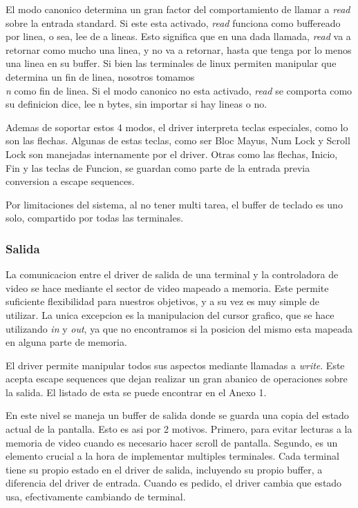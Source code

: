 \documentclass[a4paper,10pt]{article}
\begin{document}
            El modo canonico determina un gran factor del comportamiento de llamar a \textit{read} sobre la entrada standard.
            Si este esta activado, \textit{read} funciona como buffereado por linea, o sea, lee de a lineas.
            Esto significa que en una dada llamada, \textit{read} va a retornar como mucho una linea, y no va a retornar, hasta que tenga por lo menos una linea en su buffer.
            Si bien las terminales de linux permiten manipular que determina un fin de linea, nosotros tomamos \textit{\\n} como fin de linea.
            Si el modo canonico no esta activado, \textit{read} se comporta como su definicion dice, lee n bytes, sin importar si hay lineas o no.

            Ademas de soportar estos 4 modos, el driver interpreta teclas especiales, como lo son las flechas.
            Algunas de estas teclas, como ser Bloc Mayus, Num Lock y Scroll Lock son manejadas internamente por el driver.
            Otras como las flechas, Inicio, Fin y las teclas de Funcion, se guardan como parte de la entrada previa conversion a escape sequences.

            Por limitaciones del sistema, al no tener multi tarea, el buffer de teclado es uno solo, compartido por todas las terminales.

        \subsubsection{Salida}
            La comunicacion entre el driver de salida de una terminal y la controladora de video se hace mediante el sector de video mapeado a memoria.
            Este permite suficiente flexibilidad para nuestros objetivos, y a su vez es muy simple de utilizar.
            La unica excepcion es la manipulacion del cursor grafico, que se hace utilizando \textit{in} y \textit{out}, ya que no encontramos si la posicion del mismo esta mapeada en alguna parte de memoria.

            El driver permite manipular todos sus aspectos mediante llamadas a \textit{write}.
            Este acepta escape sequences que dejan realizar un gran abanico de operaciones sobre la salida.
            El listado de esta se puede encontrar en el Anexo 1.
            
            En este nivel se maneja un buffer de salida donde se guarda una copia del estado actual de la pantalla.
            Esto es asi por 2 motivos.
            Primero, para evitar lecturas a la memoria de video cuando es necesario hacer scroll de pantalla.
            Segundo, es un elemento crucial a la hora de implementar multiples terminales.
            Cada terminal tiene su propio estado en el driver de salida, incluyendo su propio buffer, a diferencia del driver de entrada.
            Cuando es pedido, el driver cambia que estado usa, efectivamente cambiando de terminal.
\end{document}
